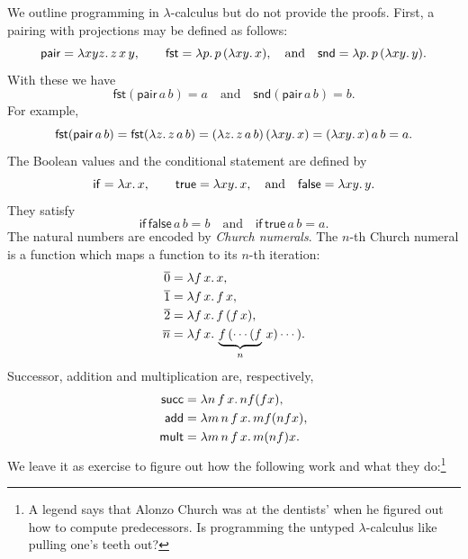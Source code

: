 We outline programming in $\lambda$-calculus but do not provide the
proofs. First, a pairing with projections may be defined as follows:
%
\begin{equation*}
  \mathsf{pair} = \lambda x y z .\,z\, x\, y,
  \qquad
  \mathsf{fst} = \lambda p .\,p \, (\lambda x y .\,x),
  \quad\text{and}\quad
  \mathsf{snd} = \lambda p .\,p \, (\lambda x y .\,y).
\end{equation*}
%
With these we have
%
\begin{equation*}
  \mathsf{fst} (\mathsf{pair}\, a\, b) = a
  \quad\text{and}\quad
  \mathsf{snd} (\mathsf{pair}\, a\, b) = b.
\end{equation*}
%
For example,
%
\begin{equation*}
  \mathsf{fst} (\mathsf{pair}\, a\, b) =
  \mathsf{fst} (\lambda z .\,z\, a\, b) =
  (\lambda z .\,z\, a\, b) \, (\lambda x y .\,x) =
  (\lambda x y .\,x) \, a \, b = a.
\end{equation*}
%
The Boolean values and the conditional statement are defined by
%
\begin{equation*}
  \mathsf{if} = \lambda x .\,x,
  \qquad
  \mathsf{true} = \lambda x y .\,x,
  \quad\text{and}\quad
  \mathsf{false} = \lambda x y .\,y.
\end{equation*}
%
They satisfy
%
\begin{equation*}
  \mathsf{if}\,\mathsf{false}\,a\,b = b
  \quad\text{and}\quad
  \mathsf{if}\,\mathsf{true}\,a\,b = a.
\end{equation*}
%
The natural numbers are encoded by \emph{Church numerals}. The $n$-th
Church numeral is a function which maps a function to its $n$-th
iteration:
%
\begin{align*}
  \overline{0} &= \lambda f\,x .\,x,\\
  \overline{1} &= \lambda f\,x .\,f\,x,\\
  \overline{2} &= \lambda f\,x .\,f\,(f\,x),\\
  \overline{n} &= \lambda f\,x .\,\underbrace{f\,(\cdots (f}_n\,x) \cdots).
\end{align*}
%
Successor, addition and multiplication are, respectively,
%
\begin{align*}
  \mathsf{succ} &= \lambda n\,f\,x .\,n f (f x),\\
  \mathsf{add} &= \lambda m\,n\,f\,x .\,m f (n f x),\\
  \mathsf{mult} &= \lambda m\,n\,f\,x .\,m (n f) x.
\end{align*}
%
We leave it as exercise to figure out how the following work and what
they do:\footnote{A legend says that Alonzo Church was at the
  dentists' when he figured out how to compute predecessors. Is
  programming the untyped $\lambda$-calculus like pulling one's teeth
  out?}

